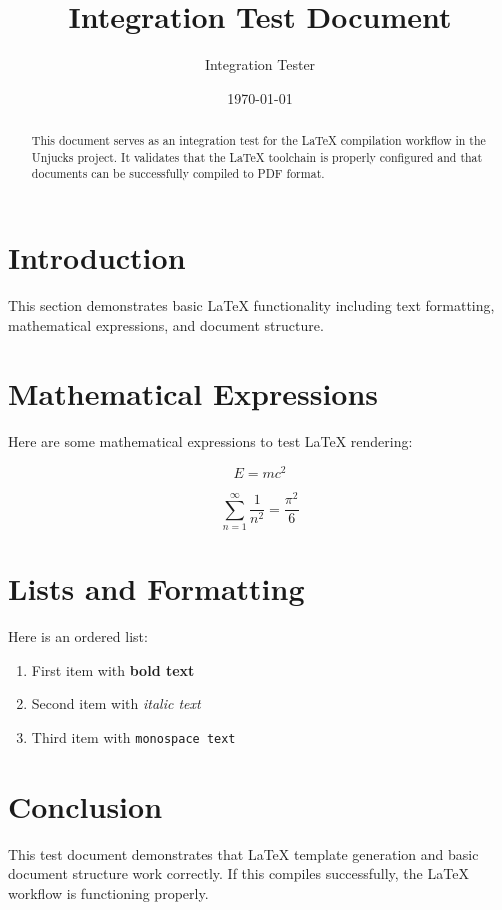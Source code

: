 \documentclass[12pt,a4paper]{article}
\title{Integration Test Document}
\author{Integration Tester}
\date{\today}
\begin{document}
\maketitle

\begin{abstract}
This document serves as an integration test for the LaTeX compilation workflow in the Unjucks project. It validates that the LaTeX toolchain is properly configured and that documents can be successfully compiled to PDF format.
\end{abstract}

\section{Introduction}
This section demonstrates basic LaTeX functionality including text formatting, mathematical expressions, and document structure.

\section{Mathematical Expressions}
Here are some mathematical expressions to test LaTeX rendering:

\begin{equation}
E = mc^2
\end{equation}

\begin{equation}
\sum_{n=1}^{\infty} \frac{1}{n^2} = \frac{\pi^2}{6}
\end{equation}

\section{Lists and Formatting}
Here is an ordered list:
\begin{enumerate}
\item First item with \textbf{bold text}
\item Second item with \textit{italic text}
\item Third item with \texttt{monospace text}
\end{enumerate}

\section{Conclusion}
This test document demonstrates that LaTeX template generation and basic document structure work correctly. If this compiles successfully, the LaTeX workflow is functioning properly.
\end{document}
